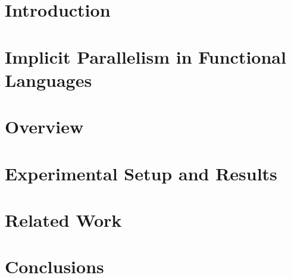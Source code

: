 
%
%
%
%
%

\section{Introduction}
\label{sec:Intro}


\section{Implicit Parallelism in Functional Languages}
\label{sec:ParFunc}


\section{Overview}
\label{sec:Overview}


% 

\section{Experimental Setup and Results}
\label{sec:Results}


\section{Related Work}
\label{sec:Related}


\section{Conclusions}
\label{sec:Conclusion}





%
%
%

%
